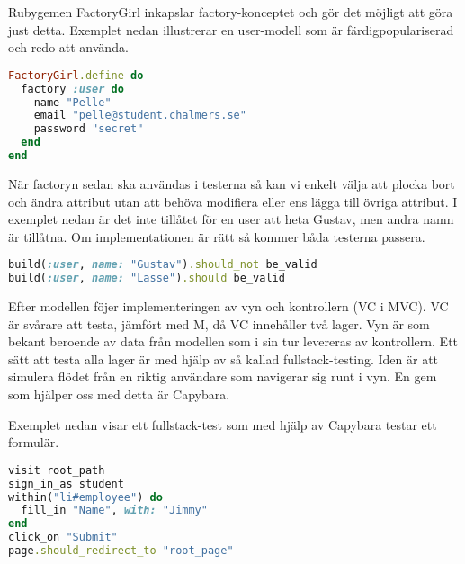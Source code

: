 Rubygemen FactoryGirl inkapslar factory-konceptet och gör det möjligt att göra just detta. Exemplet nedan illustrerar en user-modell som är färdigpopulariserad och redo att använda.

\begin{lstlisting}[language=Ruby]
FactoryGirl.define do
  factory :user do
    name "Pelle"
    email "pelle@student.chalmers.se"
    password "secret"
  end
end
\end{lstlisting}

När factoryn sedan ska användas i testerna så kan vi enkelt välja att plocka bort och ändra attribut utan att behöva modifiera eller ens lägga till övriga attribut. I exemplet nedan är det inte tillåtet för en user att heta Gustav, men andra namn är tillåtna. Om implementationen är rätt så kommer båda testerna passera.

\begin{lstlisting}[language=Ruby]
build(:user, name: "Gustav").should_not be_valid
build(:user, name: "Lasse").should be_valid
\end{lstlisting}

Efter modellen föjer implementeringen av vyn och kontrollern (VC i MVC). VC är svårare att testa, jämfört med M, då VC innehåller två lager. Vyn är som bekant beroende av data från modellen som i sin tur levereras av kontrollern. Ett sätt att testa alla lager är med hjälp av så kallad fullstack-testing. Iden är att simulera flödet från en riktig användare som navigerar sig runt i vyn. En gem som hjälper oss med detta är Capybara.

Exemplet nedan visar ett fullstack-test som med hjälp av Capybara testar ett formulär.

\begin{lstlisting}[language=Ruby]
visit root_path
sign_in_as student
within("li#employee") do
  fill_in "Name", with: "Jimmy"
end
click_on "Submit"
page.should_redirect_to "root_page"
\end{lstlisting}

